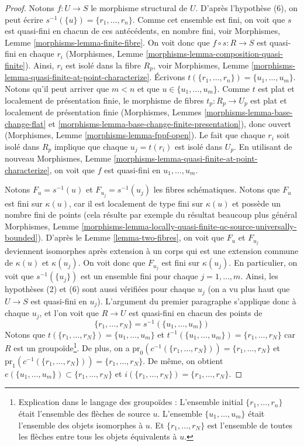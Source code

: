 \begin{proof}
Notons $f : U \to S$ le morphisme structural de $U$.
D'après l'hypothèse (6), on peut écrire $s^{-1}(\{u\}) = \{r_1, \ldots, r_n\}$.
Comme cet ensemble est fini, on voit que $s$ est quasi-fini en chacun de
ces antécédents, en nombre fini, voir
Morphismes, Lemme \ref{morphisms-lemma-finite-fibre}.
On voit donc que $f \circ s : R \to S$ est quasi-fini en chaque $r_i$
(Morphismes, Lemme \ref{morphisms-lemma-composition-quasi-finite}).
Ainsi, $r_i$ est isolé dans la fibre $R_p$, voir
Morphismes, Lemme \ref{morphisms-lemma-quasi-finite-at-point-characterize}.
Écrivons $t(\{r_1, \ldots, r_n\}) = \{u_1, \ldots, u_m\}$.
Notons qu'il peut arriver que $m < n$ et que
$u \in \{u_1, \ldots, u_m\}$.
Comme $t$ est plat et localement de présentation finie,
le morphisme de fibres $t_p : R_p \to U_p$ est plat et localement de
présentation finie (Morphismes,
Lemmes \ref{morphisms-lemma-base-change-flat} et
\ref{morphisms-lemma-base-change-finite-presentation}),
donc ouvert (Morphismes,
Lemme \ref{morphisms-lemma-fppf-open}).
Le fait que chaque $r_i$ soit isolé dans $R_p$ implique que
chaque $u_j = t(r_i)$ est isolé dans $U_p$. En utilisant de nouveau
Morphismes, Lemme \ref{morphisms-lemma-quasi-finite-at-point-characterize},
on voit que $f$ est quasi-fini en $u_1, \ldots, u_m$.

\medskip\noindent
Notons $F_u = s^{-1}(u)$ et $F_{u_j} = s^{-1}(u_j)$ les fibres schématiques.
Notons que $F_u$ est fini sur $\kappa(u)$, car il est localement de type fini
sur $\kappa(u)$ et possède un nombre fini de points (cela résulte par exemple
du résultat beaucoup plus général
Morphismes, Lemme
\ref{morphisms-lemma-locally-quasi-finite-qc-source-universally-bounded}).
D'après
le Lemme \ref{lemma-two-fibres},
on voit que $F_u$ et $F_{u_j}$ deviennent isomorphes après extension à un corps
qui est une extension commune de $\kappa(u)$ et $\kappa(u_j)$. On voit donc
que $F_{u_j}$ est fini sur $\kappa(u_j)$. En particulier, on voit que
$s^{-1}(\{u_j\})$ est un ensemble fini pour chaque $j = 1, \ldots, m$.
Ainsi, les hypothèses (2) et (6) sont aussi vérifiées pour chaque $u_j$
(on a vu plus haut que $U \to S$ est quasi-fini en $u_j$).
L'argument du premier paragraphe s'applique donc à chaque $u_j$,
et l'on voit que $R \to U$ est quasi-fini en chacun des points de
$$
\{r_1, \ldots, r_N\} = s^{-1}(\{u_1, \ldots, u_m\})
$$
Notons que $t(\{r_1, \ldots, r_N\}) = \{u_1, \ldots, u_m\}$ et
$t^{-1}(\{u_1, \ldots, u_m\}) = \{r_1, \ldots, r_N\}$
car $R$ est un groupoïde\footnote{Explication dans le langage des groupoïdes :
L'ensemble initial $\{r_1, \ldots, r_n\}$ était l'ensemble des flèches de
source $u$. L'ensemble $\{u_1, \ldots, u_m\}$ était l'ensemble des objets
isomorphes à $u$. Et $\{r_1, \ldots, r_N\}$ est l'ensemble de toutes les flèches
entre tous les objets équivalents à $u$.}. De plus, on a
$\text{pr}_0(c^{-1}(\{r_1, \ldots, r_N\})) = \{r_1, \ldots, r_N\}$
et
$\text{pr}_1(c^{-1}(\{r_1, \ldots, r_N\})) = \{r_1, \ldots, r_N\}$.
De même, on obtient $e(\{u_1, \ldots, u_m\}) \subset \{r_1, \ldots, r_N\}$
et $i(\{r_1, \ldots, r_N\}) = \{r_1, \ldots, r_N\}$.


\end{proof}
